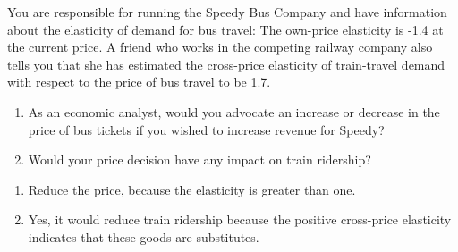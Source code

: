 \begin{enumialphparenastyle}
\begin{ex}\label{ex:ch4ex8}
You are responsible for running the Speedy Bus Company and have information about the elasticity of demand for bus travel: The own-price elasticity is -1.4 at the current price. A friend who works in the competing railway company also tells you that she has estimated the cross-price elasticity of train-travel demand with respect to the price of bus travel to be 1.7.
\begin{enumerate}
	\item	As an economic analyst, would you advocate an increase or decrease in the price of bus tickets if you wished to increase revenue for Speedy?
	\item	Would your price decision have any impact on train ridership?
\end{enumerate}
\begin{sol}
\begin{enumerate}
	\item	Reduce the price, because the elasticity is greater than one.
	\item	Yes, it would reduce train ridership because the positive cross-price elasticity indicates that these goods are substitutes.
\end{enumerate}
\end{sol}
\end{ex}


\end{enumialphparenastyle}
